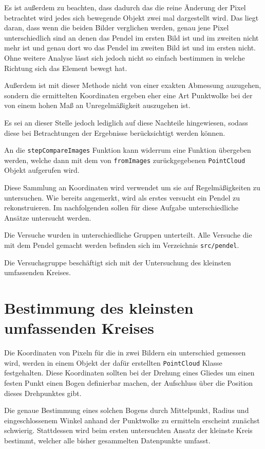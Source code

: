 Es ist außerdem zu beachten, dass dadurch das die reine Änderung der Pixel betrachtet wird jedes sich bewegende Objekt zwei mal dargestellt wird.
Das liegt daran, dass wenn die beiden Bilder verglichen werden, genau jene Pixel unterschiedlich sind an denen das Pendel im ersten Bild ist und im zweiten nicht mehr ist und genau dort wo das Pendel im zweiten Bild ist und im ersten nicht.
Ohne weitere Analyse lässt sich jedoch nicht so einfach bestimmen in welche Richtung sich das Element bewegt hat.

Außerdem ist mit dieser Methode nicht von einer exakten Abmessung auzugehen, sondern die ermittelten Koordinaten ergeben eher eine Art Punktwolke bei der von einem hohen Maß an Unregelmäßigkeit auszugehen ist.

Es sei an dieser Stelle jedoch lediglich auf diese Nachteile hingewiesen, sodass diese bei Betrachtungen der Ergebnisse berücksichtigt werden können.

An die \lstinline{stepCompareImages} Funktion kann widerrum eine Funktion übergeben werden, welche dann mit dem von \lstinline{fromImages} zurückgegebenen \lstinline{PointCloud} Objekt aufgerufen wird.

Diese Sammlung an Koordinaten wird verwendet um sie auf Regelmäßigkeiten zu untersuchen.
Wie bereits angemerkt, wird als erstes versucht ein Pendel zu rekonstruieren.
Im nachfolgenden sollen für diese Aufgabe unterschiedliche Ansätze untersucht werden.

Die Versuche wurden in unterschiedliche Gruppen unterteilt.
Alle Versuche die mit dem Pendel gemacht werden befinden sich im Verzeichnis \lstinline{src/pendel}.

Die Versuchsgruppe  beschäftigt sich mit der Untersuchung des kleinsten umfassenden Kreises. %

\section{Bestimmung des kleinsten umfassenden Kreises}

Die Koordinaten von Pixeln für die in zwei Bildern ein unterschied gemessen wird, werden in einem Objekt der dafür erstellten \lstinline{PointCloud} Klasse festgehalten.
Diese Koordinaten sollten bei der Drehung eines Gliedes um einen festen Punkt einen Bogen definierbar machen, der Aufschluss über die Position dieses Drehpunktes gibt.

Die genaue Bestimmung eines solchen Bogens durch Mittelpunkt, Radius und eingeschlossenem Winkel anhand der Punktwolke zu ermitteln erscheint zunächst schwierig.
Stattdessen wird beim ersten untersuchten Ansatz der kleinste Kreis bestimmt, welcher alle bisher gesammelten Datenpunkte umfasst.

